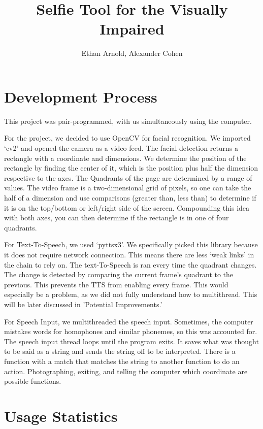 \documentclass{article}
\title{Selfie Tool for the Visually Impaired}
\author{Ethan Arnold, Alexander Cohen}
\begin{document}
\maketitle


\section{Development Process}
This project was pair-programmed, with us simultaneously using the computer.


For the project, we decided to use OpenCV for facial recognition.
We imported `cv2' and opened the camera as a video feed.
The facial detection returns a rectangle with a coordinate and dimensions.
We determine the position of the rectangle by finding the center of it, which is the position plus half the dimension respective to the axes.
The Quadrants of the page are determined by a range of values.
The video frame is a two-dimensional grid of pixels, so one can take the half of a dimension and use comparisons (greater than, less than) to determine if it is on the top/bottom or left/right side of the screen.
Compounding this idea with both axes, you can then determine if the rectangle is in one of four quadrants.


For Text-To-Speech, we used `pyttsx3'. We specifically picked this library because it does not require network connection.
This means there are less `weak links' in the chain to rely on.
The text-To-Speech is ran every time the quadrant changes.
The change is detected by comparing the current frame's quadrant to the previous.
This prevents the TTS from enabling every frame.
This would especially be a problem, as we did not fully understand how to multithread. This will be later discussed in 'Potential Improvements.'

For Speech Input, we multithreaded the speech input.
Sometimes, the computer mistakes words for homophones and similar phonemes, so this was accounted for.
The speech input thread loops until the program exits. It saves what was thought to be said as a string and sends the string off to be interpreted.
There is a function with a match that matches the string to another function to do an action.
Photographing, exiting, and telling the computer which coordinate are possible functions.

\section{Usage Statistics}
\end{document}
